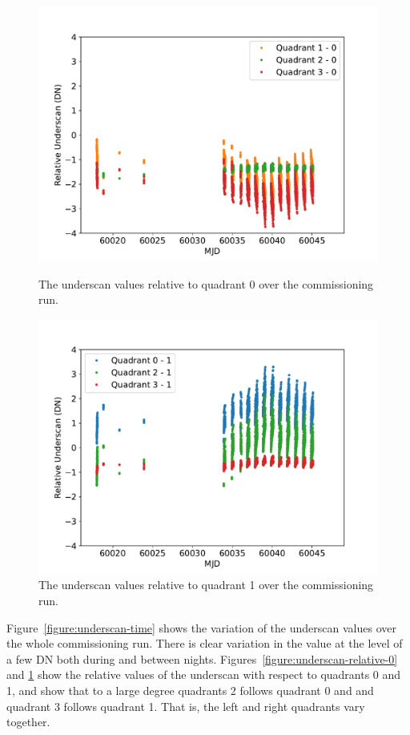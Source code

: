 \documentclass{article}
\begin{document}
\begin{figure}[pb]
\begin{center}
\includegraphics[width=0.7\columnwidth]{figures/underscan-relative-0.pdf}
\medskip
\caption{The underscan values relative to quadrant 0 over the commissioning run.}
\label{figure:underscan-relative-0}
\end{center}
\begin{center}
\includegraphics[width=0.7\columnwidth]{figures/underscan-relative-1.pdf}
\medskip
\caption{The underscan values relative to quadrant 1 over the commissioning run.}
\label{figure:underscan-relative-1}
\end{center}
\end{figure}

Figure~\ref{figure:underscan-time} shows the variation of the underscan values over the whole commissioning run. There is clear variation in the value at the level of a few DN both during and between nights. Figures~\ref{figure:underscan-relative-0} and \ref{figure:underscan-relative-1} show the relative values of the underscan with respect to quadrants 0 and 1, and show that to a large degree quadrants 2 follows quadrant 0 and and quadrant 3 follows quadrant 1. That is, the left and right quadrants vary together. 
\end{document}
